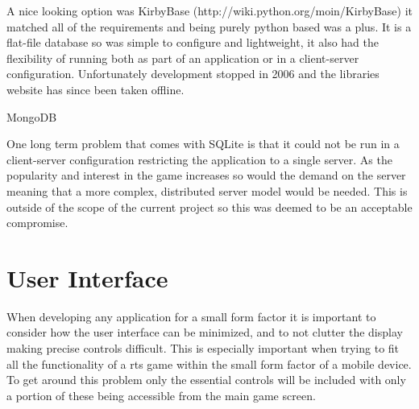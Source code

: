 A nice looking option was KirbyBase (http://wiki.python.org/moin/KirbyBase) it matched all of the requirements and being purely python based was a plus. It is a flat-file database so was simple to configure and lightweight, it also had the flexibility of running both as part of an application or in a client-server configuration. Unfortunately development stopped in 2006 and the libraries website has since been taken offline.

MongoDB  

One long term problem that comes with SQLite is that it could not be run in a client-server configuration restricting the application to a single server. As the popularity and interest in the game increases so would the demand on the server meaning that a more complex, distributed server model would be needed. This is outside of the scope of the current project so this was deemed to be an acceptable compromise.

\section{User Interface}
When developing any application for a small form factor it is important to consider how the user interface can be minimized, and to not clutter the display making precise controls difficult. This is especially important when trying to fit all the functionality of a \gls{rts} game within the small form factor of a mobile device. To get around this problem only the essential controls will be included with only a portion of these being accessible from the main game screen.

